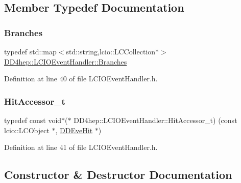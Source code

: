 \subsection{Member Typedef Documentation}
\hypertarget{class_d_d4hep_1_1_l_c_i_o_event_handler_abb97052600fb229e9fdc6cfeefdc4177}{}\label{class_d_d4hep_1_1_l_c_i_o_event_handler_abb97052600fb229e9fdc6cfeefdc4177} 
\subsubsection{\texorpdfstring{Branches}{Branches}}
{\footnotesize\ttfamily typedef std\+::map$<$std\+::string,lcio\+::\+L\+C\+Collection$\ast$$>$ \hyperlink{class_d_d4hep_1_1_l_c_i_o_event_handler_abb97052600fb229e9fdc6cfeefdc4177}{D\+D4hep\+::\+L\+C\+I\+O\+Event\+Handler\+::\+Branches}}



Definition at line 40 of file L\+C\+I\+O\+Event\+Handler.\+h.

\hypertarget{class_d_d4hep_1_1_l_c_i_o_event_handler_a11cc45d455e96d50c653d2a722f5e589}{}\label{class_d_d4hep_1_1_l_c_i_o_event_handler_a11cc45d455e96d50c653d2a722f5e589} 
\subsubsection{\texorpdfstring{Hit\+Accessor\+\_\+t}{HitAccessor\_t}}
{\footnotesize\ttfamily typedef const void$\ast$($\ast$ D\+D4hep\+::\+L\+C\+I\+O\+Event\+Handler\+::\+Hit\+Accessor\+\_\+t) (const lcio\+::\+L\+C\+Object $\ast$, \hyperlink{class_d_d4hep_1_1_d_d_eve_hit}{D\+D\+Eve\+Hit} $\ast$)}



Definition at line 41 of file L\+C\+I\+O\+Event\+Handler.\+h.



\subsection{Constructor \& Destructor Documentation}
\hypertarget{class_d_d4hep_1_1_l_c_i_o_event_handler_a0b2f4815441b47379605f1059f892a59}{}\label{class_d_d4hep_1_1_l_c_i_o_event_handler_a0b2f4815441b47379605f1059f892a59} 
